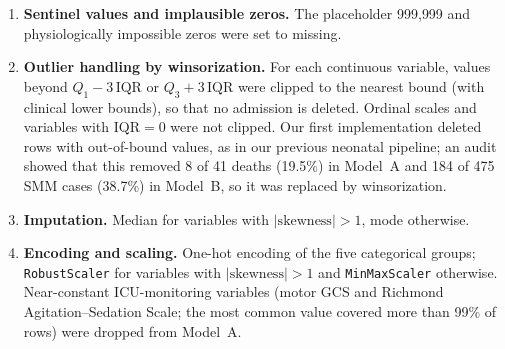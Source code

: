 \documentclass[healthcare,article,submit,pdftex,moreauthors]{Definitions/mdpi}
\begin{document}
\begin{enumerate}[leftmargin=*,labelsep=5.8mm]
\item \textbf{Sentinel values and implausible zeros.} The placeholder 999{,}999 and
      physiologically impossible zeros were set to missing.
\item \textbf{Outlier handling by winsorization.} For each continuous variable,
      values beyond $Q_1 - 3\,\mathrm{IQR}$ or $Q_3 + 3\,\mathrm{IQR}$ were clipped
      to the nearest bound (with clinical lower bounds), so that no admission is
      deleted. Ordinal scales and variables with $\mathrm{IQR}=0$ were not clipped.
      Our first implementation deleted rows with out-of-bound values, as in our
      previous neonatal pipeline; an audit showed that this removed 8 of 41 deaths
      (19.5\%) in Model~A and 184 of 475 SMM cases (38.7\%) in Model~B, so it was
      replaced by winsorization.
\item \textbf{Imputation.} Median for variables with $|\text{skewness}|>1$,
      mode otherwise.
\item \textbf{Encoding and scaling.} One-hot encoding of the five categorical
      groups; \texttt{RobustScaler} for variables with $|\text{skewness}|>1$ and
      \texttt{MinMaxScaler} otherwise. Near-constant ICU-monitoring variables
      (motor GCS and Richmond Agitation--Sedation Scale; the most common value
      covered more than 99\% of rows) were dropped from Model~A.
\end{enumerate}
\end{document}
